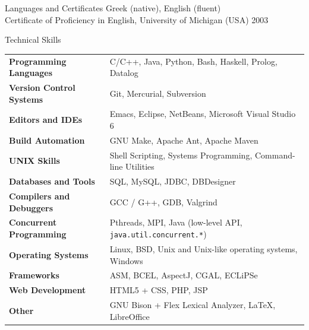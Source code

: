 \documentclass{resume}
\begin{document}
\begin{rSection}{Languages and Certificates}
  Greek (native), English (fluent) \\
  Certificate of Proficiency in English, University of Michigan (USA)
  \hfill 2003
\end{rSection}

\newpage


\begin{rSection}{Technical Skills}

{\renewcommand{\arraystretch}{1.3}
\begin{tabular}{ @{} >{\bfseries}l @{\hspace{6ex}} l }

Programming Languages
   & C/C++, Java, Python, Bash, Haskell, Prolog, Datalog \\

Version Control Systems
   & Git, Mercurial, Subversion \\

Editors and IDEs
   & Emacs, Eclipse, NetBeans, Microsoft Visual Studio 6 \\

Build Automation
   & GNU Make, Apache Ant, Apache Maven \\

UNIX Skills
   & Shell Scripting, Systems Programming, Command-line Utilities \\

Databases and Tools
   & SQL, MySQL, JDBC, DBDesigner \\

Compilers and Debuggers
   & GCC / G++, GDB, Valgrind \\

Concurrent Programming
   & Pthreads, MPI, Java (low-level API, \texttt{java.util.concurrent.*}) \\

Operating Systems
   & Linux, BSD, Unix and Unix-like operating systems, Windows \\

Frameworks
   & ASM, BCEL, AspectJ, CGAL, ECLiPSe \\

Web Development
   & HTML5 + CSS, PHP, JSP \\

Other
   & GNU Bison + Flex Lexical Analyzer, \LaTeX{}, LibreOffice \\
\end{tabular}}
\end{rSection}
\end{document}
